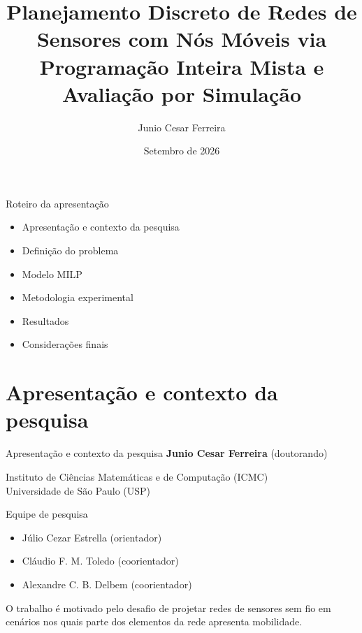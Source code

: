 \documentclass[11pt,brazil]{beamer}
\author{Junio Cesar Ferreira}
\title[Simpósio Brasileiro de Pesquisa Operacional]{\textbf{Planejamento Discreto de Redes de Sensores com Nós Móveis via Programação Inteira Mista e Avaliação por Simulação}}
\subtitle{}
\institute[ICMC-USP]{Simpósio Brasileiro de Pesquisa Operacional}
\date{Setembro de 2026}
\newcommand{\grupo}{Equipe de pesquisa}
\newcommand{\vinculo}{Instituto de Ciências Matemáticas e de Computação (ICMC)\\Universidade de São Paulo (USP)}
\begin{document}
\begin{frame}[plain]
  \maketitle
\end{frame}

\begin{frame}{Roteiro da apresentação}
  \begin{itemize}
    \item Apresentação e contexto da pesquisa
    \vfill
    \item Definição do problema
    \vfill
    \item Modelo MILP
    \vfill
    \item Metodologia experimental
    \vfill
    \item Resultados
    \vfill
    \item Considerações finais
  \end{itemize}
\end{frame}

\section{Apresentação e contexto da pesquisa}

\begin{frame}{Apresentação e contexto da pesquisa}
  \textbf{Junio Cesar Ferreira} (doutorando)
  \medskip

  \vinculo

  \begin{block}{\grupo}
    \begin{itemize}
      \item Júlio Cezar Estrella (orientador)
      \item Cláudio F. M. Toledo (coorientador)
      \item Alexandre C. B. Delbem (coorientador)
    \end{itemize}
  \end{block}
  \vfill
  O trabalho é motivado pelo desafio de projetar redes de sensores sem fio em cenários nos quais parte dos elementos da rede apresenta mobilidade.
\end{frame}
\end{document}
